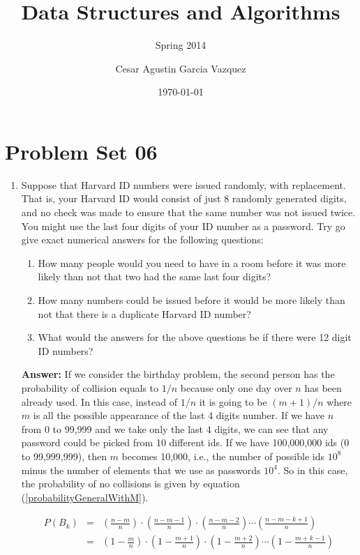 \documentclass[tikz, 12pt]{scrartcl}
\title{Data Structures and Algorithms}
\subtitle{Spring 2014}
\author{Cesar Agustin Garcia Vazquez}
\date{\today}                                           %
\begin{document}
\maketitle
\section{Problem Set 06}

\begin{enumerate}
	\item Suppose that Harvard ID numbers were issued randomly, with replacement. That is, your Harvard ID would consist of just 8 randomly generated digits, and no check was made to ensure that the same number was not issued twice. You might use the last four digits of your ID number as a password. Try go give exact numerical answers for the following questions:
	\begin{enumerate}
		\item How many people would you need to have in a room before it was more likely than not that two had the same last four digits? 
		\item How many numbers could be issued before it would be more likely than not that there is a duplicate Harvard ID number?
		\item  What would the answers for the above questions be if there were 12 digit ID numbers?
	\end{enumerate}
	
	\textbf{Answer:} If we consider the birthday problem, the second person has the probability of collision equals to $1/n$ because only one day over $n$ has been already used. In this case, instead of $1/n$  it is going to be $(m + 1)/n$ where $m$ is all the possible appearance of the last 4 digits number. If we have $n$ from 0 to 99,999 and we take only the last 4 digits, we can see that any password could be picked from 10 different ids. If we have 100,000,000 ids (0 to 99,999,999), then $m$ becomes 10,000, i.e., the number of possible ids $10^8$ minus the number of elements that we use as passwords $10^4$. So in this case, the probability of no collisions is given by equation (\ref{probabilityGeneralWithM}).
	
	\begin{eqnarray}
	P(B_k) 	&	=	&	\left( \frac{n - m}{n} \right) \cdot  \left( \frac{n - m - 1}{n} \right) \cdot \left( \frac{n - m -  2}{n} \right)\cdots\left( \frac{n - m -  k + 1}{n} \right) \nonumber \\
			&	=	&	\left(1 - \frac{m}{n} \right) \cdot \left(1 -  \frac{m + 1}{n} \right)\cdot \left(1 -  \frac{m + 2}{n} \right) \cdots \left(1 -  \frac{m + k-1}{n} \right)\label{probabilityGeneralWithM}
	\end{eqnarray}
	

\end{enumerate}
\end{document}
